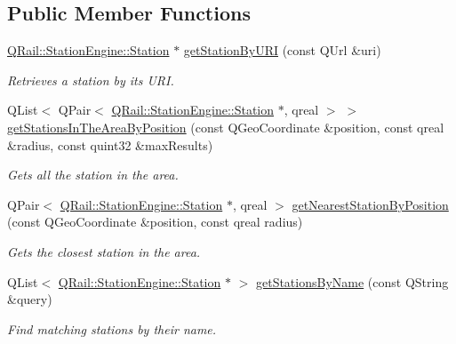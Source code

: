 \subsection*{Public Member Functions}
\begin{DoxyCompactItemize}
\item 
\mbox{\hyperlink{classQRail_1_1StationEngine_1_1Station}{Q\+Rail\+::\+Station\+Engine\+::\+Station}} $\ast$ \mbox{\hyperlink{classQRail_1_1StationEngine_1_1Factory_ad7b0c3ee3716d2a99643c0c7b0b9a9c0}{get\+Station\+By\+U\+RI}} (const Q\+Url \&uri)
\begin{DoxyCompactList}\small\item\em Retrieves a station by its U\+RI. \end{DoxyCompactList}\item 
Q\+List$<$ Q\+Pair$<$ \mbox{\hyperlink{classQRail_1_1StationEngine_1_1Station}{Q\+Rail\+::\+Station\+Engine\+::\+Station}} $\ast$, qreal $>$ $>$ \mbox{\hyperlink{classQRail_1_1StationEngine_1_1Factory_aa01df9c015321d15605192969d7d363e}{get\+Stations\+In\+The\+Area\+By\+Position}} (const Q\+Geo\+Coordinate \&position, const qreal \&radius, const quint32 \&max\+Results)
\begin{DoxyCompactList}\small\item\em Gets all the station in the area. \end{DoxyCompactList}\item 
Q\+Pair$<$ \mbox{\hyperlink{classQRail_1_1StationEngine_1_1Station}{Q\+Rail\+::\+Station\+Engine\+::\+Station}} $\ast$, qreal $>$ \mbox{\hyperlink{classQRail_1_1StationEngine_1_1Factory_a385cbfbc2697c39bd2c09b866bdfd4ac}{get\+Nearest\+Station\+By\+Position}} (const Q\+Geo\+Coordinate \&position, const qreal radius)
\begin{DoxyCompactList}\small\item\em Gets the closest station in the area. \end{DoxyCompactList}\item 
Q\+List$<$ \mbox{\hyperlink{classQRail_1_1StationEngine_1_1Station}{Q\+Rail\+::\+Station\+Engine\+::\+Station}} $\ast$ $>$ \mbox{\hyperlink{classQRail_1_1StationEngine_1_1Factory_a892a259deeb2911edda868a09549b68a}{get\+Stations\+By\+Name}} (const Q\+String \&query)
\begin{DoxyCompactList}\small\item\em Find matching stations by their name. \end{DoxyCompactList}\end{DoxyCompactItemize}
